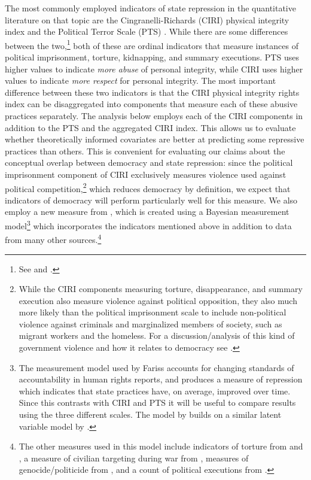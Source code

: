 \documentclass[12pt]{article}
\begin{document}
The most commonly employed indicators of state repression in the quantitative literature on that topic are the Cingranelli-Richards (CIRI) physical integrity index \citep{CIRI2010} and the Political Terror Scale (PTS) \citep{GibneyCornettWood2009}. While there are some differences between the two,\footnote{See \citet{WoodGibney2010} and \citet{CingranelliRichards2010}.} both of these are ordinal indicators that measure instances of political imprisonment, torture, kidnapping, and summary executions. PTS uses higher values to indicate {\em more abuse} of personal integrity, while CIRI uses higher values to indicate {\em more respect} for personal integrity. The most important difference between these two indicators is that the CIRI physical integrity rights index can be disaggregated into components that measure each of these abusive practices separately. The analysis below employs each of the CIRI components in addition to the PTS and the aggregated CIRI index. This allows us to evaluate whether theoretically informed covariates are better at predicting some repressive practices than others. This is convenient for evaluating our claims about the conceptual overlap between democracy and state repression: since the political imprisonment component of CIRI exclusively measures violence used against political competition,\footnote{While the CIRI components measuring torture, disappearance, and summary execution also measure violence against political opposition, they also much more likely than the political imprisonment scale to include non-political violence against criminals and marginalized members of society, such as migrant workers and the homeless. For a discussion/analysis of this kind of government violence and how it relates to democracy see \citet{Haschke2011}.} which reduces democracy by definition, we expect that indicators of democracy will perform particularly well for this measure. We also employ a new measure from \citet{Fariss2013}, which is created using a Bayesian measurement model\footnote{The measurement model used by Fariss accounts for changing standards of accountability in human rights reports, and produces a measure of repression which indicates that state practices have, on average, improved over time. Since this contrasts with CIRI and PTS it will be useful to compare results using the three different scales. The model by \citeauthor{Fariss2013} builds on a similar latent variable model by \citet{FarissSchnakenberg2011}.} which incorporates the indicators mentioned above in addition to data from many other sources.\footnote{The other measures used in this model include indicators of torture from \citet{Hathaway2002} and \citet{ConradHaglundMoore2012}, a measure of civilian targeting during war from \citet{EckHultman2007}, measures of genocide/politicide from \citet{HarffGurr1988,Rummel1995,MarshallHarffGurr2009}, and a count of political executions from \citet{TaylorJodice1983}.} 
\end{document}
